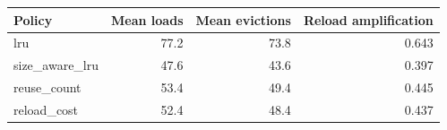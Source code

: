 \begin{tabular}{lrrr}
\toprule
Policy & Mean loads & Mean evictions & Reload amplification \\
\midrule
lru & 77.2 & 73.8 & 0.643 \\
size\_aware\_lru & 47.6 & 43.6 & 0.397 \\
reuse\_count & 53.4 & 49.4 & 0.445 \\
reload\_cost & 52.4 & 48.4 & 0.437 \\
\bottomrule
\end{tabular}
